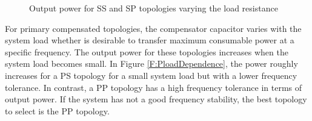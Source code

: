 \begin{figure}[htb]
\begin{center}
\begin{subfigmatrix}{2} 
\end{subfigmatrix}
\caption{Output power for SS and SP topologies varying the load resistance}
\label{F:SloadDependance}
\end{center}
\end{figure}

For primary compensated topologies, the compensator capacitor varies with the system load whether is desirable to transfer maximum consumable power at a specific frequency. The output power for these topologies increases when the system load becomes small. In Figure \ref{F:PloadDependence}, the power roughly increases for a PS topology for a small system load but with a lower frequency tolerance. In contrast, a PP topology has a high frequency tolerance in terms of output power. If the system has not a good frequency stability, the best topology to select is the PP topology.

